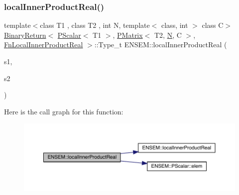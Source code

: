 \subsubsection{\texorpdfstring{localInnerProductReal()}{localInnerProductReal()}\hspace{0.1cm}{\footnotesize\ttfamily [3/3]}}
{\footnotesize\ttfamily template$<$class T1 , class T2 , int N, template$<$ class, int $>$ class C$>$ \\
\mbox{\hyperlink{structENSEM_1_1BinaryReturn}{Binary\+Return}}$<$ \mbox{\hyperlink{classENSEM_1_1PScalar}{P\+Scalar}}$<$ T1 $>$, \mbox{\hyperlink{classENSEM_1_1PMatrix}{P\+Matrix}}$<$ T2, \mbox{\hyperlink{adat__devel_2lib_2hadron_2operator__name__util_8cc_a7722c8ecbb62d99aee7ce68b1752f337}{N}}, C $>$, \mbox{\hyperlink{structENSEM_1_1FnLocalInnerProductReal}{Fn\+Local\+Inner\+Product\+Real}} $>$\+::Type\+\_\+t E\+N\+S\+E\+M\+::local\+Inner\+Product\+Real (\begin{DoxyParamCaption}\item[{const \mbox{\hyperlink{classENSEM_1_1PScalar}{P\+Scalar}}$<$ T1 $>$ \&}]{s1,  }\item[{const \mbox{\hyperlink{classENSEM_1_1PMatrix}{P\+Matrix}}$<$ T2, \mbox{\hyperlink{adat__devel_2lib_2hadron_2operator__name__util_8cc_a7722c8ecbb62d99aee7ce68b1752f337}{N}}, C $>$ \&}]{s2 }\end{DoxyParamCaption})\hspace{0.3cm}{\ttfamily [inline]}}

Here is the call graph for this function\+:\nopagebreak
\begin{figure}[H]
\begin{center}
\leavevmode
\includegraphics[width=350pt]{df/d0a/group__primmatrix_ga8a2b85a888121b8b0ff46870c7705474_cgraph}
\end{center}
\end{figure}
\mbox{\label{group__primmatrix_ga701b80e6864ced6a31a2abc314946f2f}} 
